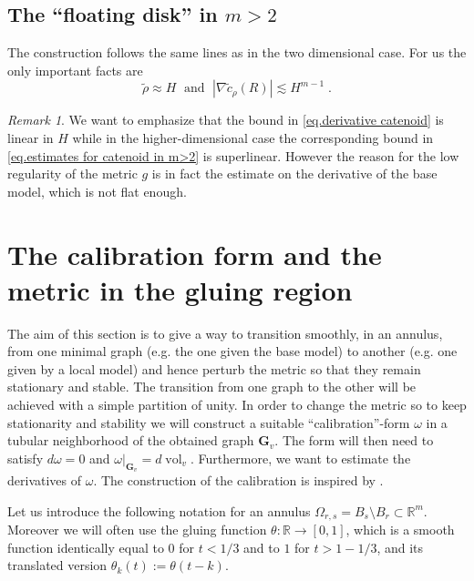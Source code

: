 \documentclass[reqno]{amsart}
\theoremstyle{definition}
\theoremstyle{remark}
\newtheorem{remark}[definition]{Remark}
\numberwithin{equation}{section}
\newcommand{\R}{\mathbb{R}}
\newcommand{\bG}{\mathbf{G}} %
\begin{document}
\subsection{The ``floating disk'' in $m>2$}\label{subsec.floating disk m>2}
The construction follows the same lines as in the two dimensional case. For us the only important facts are 
\begin{equation}\label{eq.estimates for floating disk m>2}
    \tilde{\rho} \approx H \;\text{ and }\; |\nabla \tilde{c}_\rho(R)| \lesssim H^{m-1}\;.
\end{equation}

\begin{remark}\label{r:loss-in-2d}
We want to emphasize that the bound in \eqref{eq.derivative catenoid} is linear in $H$ while in the higher-dimensional case the corresponding bound in \eqref{eq.estimates for catenoid in m>2} is superlinear. However the reason for the low regularity of the metric $g$ is in fact the estimate on the derivative of the base model, which is not flat enough.
\end{remark}

\section{The calibration form and the metric in the gluing region}\label{sec.the calibration form}

 The aim of this section is to give a way to transition smoothly, in an annulus, from one minimal graph (e.g. the one given the base model) to another (e.g. one given by a local model) and hence perturb the metric so that they remain stationary and stable. The transition from one graph to the other will be achieved with a simple partition of unity. In order to change the metric so to keep stationarity and stability we will construct a suitable ``calibration''-form $\omega$ in a tubular neighborhood of the obtained graph $\bG_v$. The form will then need to satisfy $d\omega=0$ and $\omega|_{\bG_v}= d\operatorname{vol}_{v}$.
Furthermore, we want to estimate the derivatives of $\omega$. The construction of the calibration is inspired by \cite{DDH}. 

Let us introduce the following notation for an annulus $\Omega_{r,s}=B_{s}\setminus B_r \subset  \R^m$. Moreover we will often use the gluing function $\theta \colon \R\to [0,1]$, which is a smooth function identically equal to $0$ for $t<1/3$ and to $1$ for $t>1-1/3$, and its translated version $\theta_k(t):=\theta(t-k)$.
\end{document}
